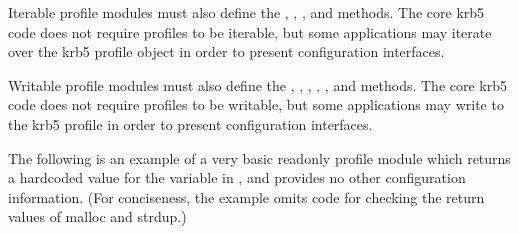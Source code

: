 \documentclass[letterpaper,10pt,english]{sphinxmanual}
\begin{document}
\sphinxAtStartPar
Iterable profile modules must also define the ,
, , and  methods.  The
core krb5 code does not require profiles to be iterable, but some
applications may iterate over the krb5 profile object in order to
present configuration interfaces.

\sphinxAtStartPar
Writable profile modules must also define the ,
, , ,
, and  methods.  The core krb5 code does not
require profiles to be writable, but some applications may write to
the krb5 profile in order to present configuration interfaces.

\sphinxAtStartPar
The following is an example of a very basic read\sphinxhyphen{}only profile module
which returns a hardcoded value for the  variable in
, and provides no other configuration information.
(For conciseness, the example omits code for checking the return
values of malloc and strdup.)
\end{document}
